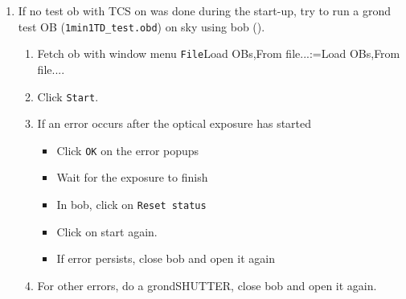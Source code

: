 \documentclass[11pt,fleqn,a4paper]{book}
\makeatletter
\def\menu#1#2{\texttt{#1}\ifx{}#2\else\@for\@x:=#2\do{$\rightarrow$\texttt{\@x}}\fi}
\def\wmenu#1#2{window menu \menu{#1}{#2}}
\def\fetchob{\wmenu{File}{Load OBs,From file...}}
\makeatother
\begin{document}
\begin{enumerate}
\begin{enumerate}
              If necessary, set \texttt{\gls{mirr3}} motor on the \gls{ferosics} ()
              \begin{itemize}
                \item to \texttt{WFI} for observations with \gls{wfi} or \gls{grond};
                \item to \texttt{FEROS} for observations with \gls{feros}.
              \end{itemize}
              (Select the \texttt{\gls{mirr3}} check box, select instrument, click \texttt{SETUP}, deselect checkbox.)
        \item Check \gls{grond} \gls{M3} mirror on the \gls{grond} control ().\\
              If necessary, type 
              \begin{itemize}
                  \item \texttt{\gls{grondM3} WFI} for \gls{feros} or \gls{wfi} observations
                  \item \texttt{\gls{grondM3} GROND} for \gls{grond} observations.
              \end{itemize}
     \end{enumerate}
  \item If no test \gls{ob} with TCS on was done during the start-up, try to run a \gls{grond} test OB (\texttt{1min1TD\_test.obd}) on sky using \gls{bob} ().
     \begin{enumerate}
       \item Fetch \gls{ob} with \fetchob.
       \item Click \texttt{Start}.      
       \item If an error occurs after the optical exposure has started
             \begin{itemize}
                \item Click \texttt{OK} on the error popups
                \item Wait for the exposure to finish
                \item In \gls{bob}, click on \texttt{Reset status}
                \item Click on start again.
                \item If error persists, close \gls{bob} and open it again
             \end{itemize} 
       \item For other errors, do a \gls{grondSHUTTER}, close bob and open it again.
     \end{enumerate}
\end{enumerate}
\end{document}
